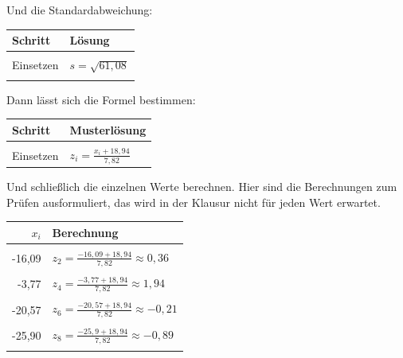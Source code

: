 \documentclass[
  11pt,
  ngerman,
  a4paper,
]{report}
\begin{document}
Und die Standardabweichung:

\begin{table}[H]
\centering
\begin{tabular}{ll}
\toprule
\textbf{Schritt} & \textbf{Lösung}\\
\midrule
\cellcolor{gray!6}{Formel} & \cellcolor{gray!6}{$s=\sqrt{s^2}$}\\
Einsetzen & $s=\sqrt{61{,}08}$\\
\cellcolor{gray!6}{Ergebnis} & \cellcolor{gray!6}{$s\approx7{,}82$}\\
\bottomrule
\end{tabular}
\end{table}

Dann lässt sich die Formel bestimmen:

\begin{table}[H]
\centering
\begin{tabular}{l>{\raggedright\arraybackslash}p{8cm}}
\toprule
\textbf{Schritt} & \textbf{Musterlösung}\\
\midrule
\cellcolor{gray!6}{Formel} & \cellcolor{gray!6}{$z_{i} = \frac{x_{i} - \bar{x}}{s}$}\\
Einsetzen & $z_{i} = \frac{x_{i} +18{,}94}{7{,}82}$\\
\bottomrule
\end{tabular}
\end{table}

Und schließlich die einzelnen Werte berechnen. Hier sind die Berechnungen zum Prüfen ausformuliert, das wird in der Klausur nicht für jeden Wert erwartet.

\begin{table}[H]
\centering
\begin{tabular}{r>{\raggedright\arraybackslash}p{8cm}}
\toprule
\textbf{$x_i$} & \textbf{Berechnung}\\
\midrule
\cellcolor{gray!6}{-16,93} & \cellcolor{gray!6}{$z_{1}=\frac{-16{,}93+18{,}94}{7{,}82}\approx0{,}26$}\\
-16,09 & $z_{2}=\frac{-16{,}09+18{,}94}{7{,}82}\approx0{,}36$\\
\cellcolor{gray!6}{-10,97} & \cellcolor{gray!6}{$z_{3}=\frac{-10{,}97+18{,}94}{7{,}82}\approx1{,}02$}\\
-3,77 & $z_{4}=\frac{-3{,}77+18{,}94}{7{,}82}\approx1{,}94$\\
\cellcolor{gray!6}{-25,55} & \cellcolor{gray!6}{$z_{5}=\frac{-25{,}55+18{,}94}{7{,}82}\approx-0{,}85$}\\
-20,57 & $z_{6}=\frac{-20{,}57+18{,}94}{7{,}82}\approx-0{,}21$\\
\cellcolor{gray!6}{-23,61} & \cellcolor{gray!6}{$z_{7}=\frac{-23{,}61+18{,}94}{7{,}82}\approx-0{,}6$}\\
-25,90 & $z_{8}=\frac{-25{,}9+18{,}94}{7{,}82}\approx-0{,}89$\\
\cellcolor{gray!6}{-27,08} & \cellcolor{gray!6}{$z_{9}=\frac{-27{,}08+18{,}94}{7{,}82}\approx-1{,}04$}\\
\bottomrule
\end{tabular}
\end{table}
\end{document}
